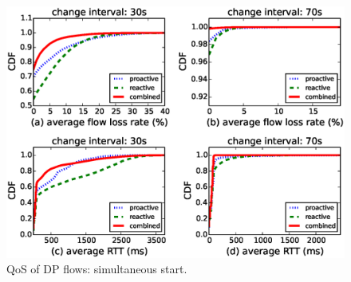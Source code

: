 \begin{figure}[!t]
        \centering
        \includegraphics[width=\columnwidth]{chap-scalims/figure/syn-lossrate-rtt.eps}
        \caption{QoS of DP flows: simultaneous start.}
        \label{fig:syn-lossrate-rtt}
        \vspace{-4mm}
\end{figure}



